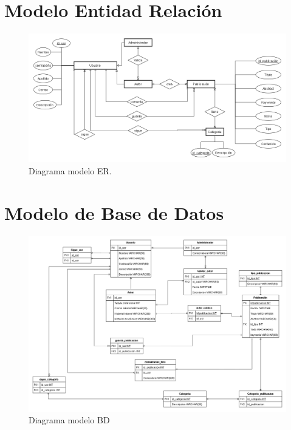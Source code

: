\documentclass[a4paper,12 pt]{article}
\begin{document}
\begin{landscape}
\section{Modelo Entidad Relación}
    \begin{figure}[H]
        \centering
        \includegraphics[scale = 0.7]{images/ERD_v02.png}
        \caption{Diagrama modelo ER.}
        \label{F13}
    \end{figure}{}

\section{Modelo de Base de Datos}
    \begin{figure}[H]
        \centering
        \includegraphics[scale = 0.55]{images/BD_v02.png}
        \caption{Diagrama modelo BD}
        \label{F11}
    \end{figure}{}
\end{landscape}
\end{document}
